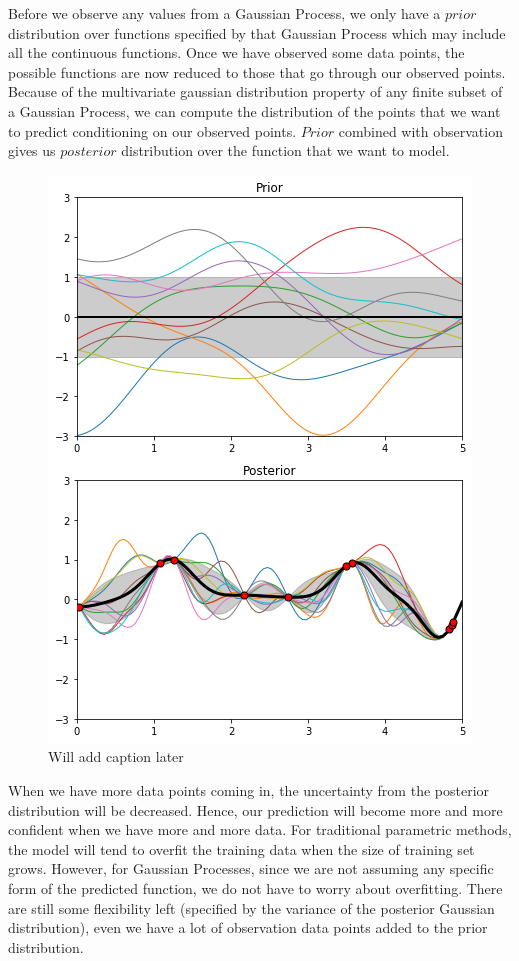 \documentclass[11pt,a4paper]{article}
\theoremstyle{definition}
\numberwithin{equation}{section}
\begin{document}
Before we observe any values from a Gaussian Process, we only have a $prior$ distribution over functions specified by that Gaussian Process which may include all the continuous functions. Once we have observed some data points, the possible functions are now reduced to those that go through our observed points. Because of the multivariate gaussian distribution property of any finite subset of a Gaussian Process, we can compute the distribution of the points that we want to predict conditioning on our observed points. $Prior$ combined with observation gives us $posterior$ distribution over the function that we want to model.

\begin{figure}[h!]
	\centering
	\includegraphics[width=0.6\linewidth]{gp.png}
	\caption{Will add caption later}
	\label{fig:gp}
\end{figure}

When we have more data points coming in, the uncertainty from the posterior distribution will be decreased. Hence, our prediction will become more and more confident when we have more and more data. For traditional parametric methods, the model will tend to overfit the training data when the size of training set grows. However, for Gaussian Processes, since we are not assuming any specific form of the predicted function, we do not have to worry about overfitting. There are still some flexibility left (specified by the variance of the posterior Gaussian distribution), even we have a lot of observation data points added to the  prior distribution. 
\end{document}
